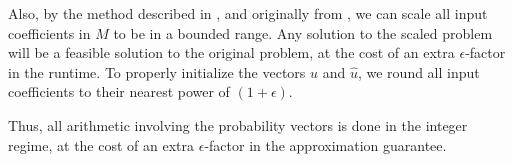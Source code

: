 \documentclass[11pt]{article}
\newcommand{\uhat}{\hat{u}}
\newcommand{\epsUp}{(1+\epsilon)}
\begin{document}
Also, by the method described in \cite{kouf2007}, and originally from
\cite{luby1993}, we can scale all input coefficients in $M$ to be in a bounded range. 
Any solution to the scaled problem will be a feasible solution to the
 original problem, at the cost of an extra $\epsilon$-factor in the runtime.  
 To properly initialize the vectors $u$ and $\uhat$, we round all input coefficients to their nearest power of $\epsUp$.  

Thus, all arithmetic involving the probability vectors is done in the integer regime, at the cost of an extra $\epsilon$-factor in the approximation guarantee.  


%
%
% 
%
%
%
%  
     
\end{document}
